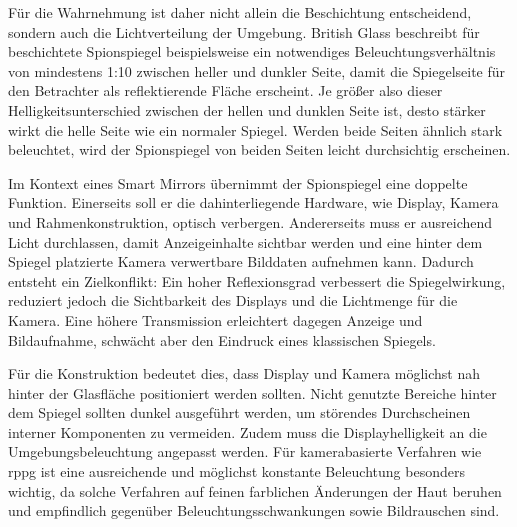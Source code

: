 Für die Wahrnehmung ist daher nicht allein die Beschichtung entscheidend, sondern auch die Lichtverteilung der Umgebung. British Glass beschreibt für beschichtete Spionspiegel beispielsweise ein notwendiges Beleuchtungsverhältnis von mindestens 1:10 zwischen heller und dunkler Seite, damit die Spiegelseite für den Betrachter als reflektierende Fläche erscheint. 
Je größer also dieser Helligkeitsunterschied zwischen der hellen und dunklen Seite ist, desto stärker wirkt die helle Seite wie ein normaler Spiegel. Werden beide Seiten ähnlich stark beleuchtet, wird der Spionspiegel von beiden Seiten leicht durchsichtig erscheinen.


Im Kontext eines Smart Mirrors übernimmt der Spionspiegel eine doppelte Funktion. Einerseits soll er die dahinterliegende Hardware, wie Display, Kamera und Rahmenkonstruktion, optisch verbergen. Andererseits muss er ausreichend Licht durchlassen, damit Anzeigeinhalte sichtbar werden und eine hinter dem Spiegel platzierte Kamera verwertbare Bilddaten aufnehmen kann. Dadurch entsteht ein Zielkonflikt: Ein hoher Reflexionsgrad verbessert die Spiegelwirkung, reduziert jedoch die Sichtbarkeit des Displays und die Lichtmenge für die Kamera. Eine höhere Transmission erleichtert dagegen Anzeige und Bildaufnahme, schwächt aber den Eindruck eines klassischen Spiegels.

Für die Konstruktion bedeutet dies, dass Display und Kamera möglichst nah hinter der Glasfläche positioniert werden sollten. Nicht genutzte Bereiche hinter dem Spiegel sollten dunkel ausgeführt werden, um störendes Durchscheinen interner Komponenten zu vermeiden. Zudem muss die Displayhelligkeit an die Umgebungsbeleuchtung angepasst werden. Für kamerabasierte Verfahren wie \ac{rppg} ist eine ausreichende und möglichst konstante Beleuchtung besonders wichtig, da solche Verfahren auf feinen farblichen Änderungen der Haut beruhen und empfindlich gegenüber Beleuchtungsschwankungen sowie Bildrauschen sind.

